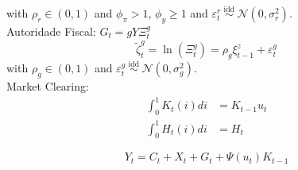 with $\rho_{r} \in(0,1)$ and $\phi_{\pi} >1$, $\phi_{y} \geq 1$ and $\varepsilon_{t}^{r} \stackrel{\text { idd }}{\sim} \mathcal{N}\left(0, \sigma_{r}^{2}\right)$.\\

Autoridade Fiscal: $G_{t}=g Y \Xi_{t}^{g}$
$$
\tilde{\zeta}_{t}^{g}=\ln \left(\Xi_{t}^{g}\right)=\rho_{g} \xi_{t-1}^{z}+\varepsilon_{t}^{g}
$$
with $\rho_{g} \in(0,1)$ and $\varepsilon_{t}^{g} \stackrel{\text { idd }}{\sim} \mathcal{N}\left(0, \sigma_{g}^{2}\right) .$ \\

Market Clearing:
$$
\begin{aligned}
\int_{0}^{1} K_{t}(i) d i &=K_{t-1} u_{t} \\
\int_{0}^{1} H_{t}(i) d i &=H_{t}
\end{aligned}
$$


$$
Y_{t}=C_{t}+X_{t}+G_{t}+\Psi\left(u_{t}\right) K_{t-1}
$$\\


